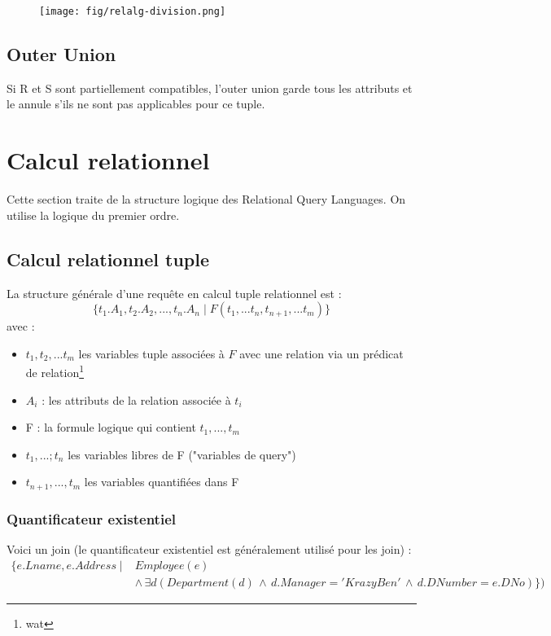\documentclass[a4paper]{article}
\begin{document}
  \begin{figure}[H]
    \center
    \texttt{[image: fig/relalg-division.png]}
  \end{figure}

  \subsection{Outer Union}
  Si R et S sont partiellement compatibles, l'outer union garde tous les attributs
  et le annule s'ils ne sont pas applicables pour ce tuple.


\section{Calcul relationnel}
  Cette section traite de la structure logique des Relational Query Languages.
  On utilise la logique du premier ordre.\\

  \subsection{Calcul relationnel tuple}
  La structure générale d'une requête en calcul tuple relationnel est :
  $$ \{t_1.A_1, t_2.A_2,...,t_n.A_n\; | \; F(t_1, ... t_n,t_{n+1},...t_{m})\} $$
  avec :
  \begin{itemize}
    \item $t_1, t_2,...t_m$ les variables tuple associées à $F$ avec une relation
    via un prédicat de relation\footnote{wat}
    \item $A_i$ : les attributs de la relation associée à $t_i$
    \item F : la formule logique qui contient $t_1,...,t_m$
    \item $t_1,...;t_n$ les variables libres de F ("variables de query")
    \item $t_{n+1},...,t_m$ les variables quantifiées dans F
  \end{itemize}

  \subsubsection{Quantificateur existentiel}
  Voici un join (le quantificateur existentiel est généralement utilisé pour les
  join) :
  \begin{align*}
    \{e.Lname, e.Address\; | \; &Employee(e)\\
    &\land\, \exists d (Department(d) \,\land\, d.Manager = 'KrazyBen'\, \land\, d.DNumber = e.DNo)\} )
  \end{align*}
\end{document}
